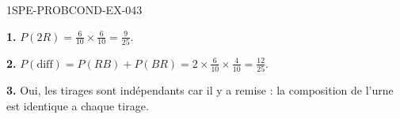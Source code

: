 \begin{corrige}{1SPE-PROBCOND-EX-043}

\textbf{1.} $P(2R) = \frac{6}{10}\times\frac{6}{10} = \frac{9}{25}$.

\textbf{2.} $P(\text{diff}) = P(RB)+P(BR) = 2\times\frac{6}{10}\times\frac{4}{10} = \frac{12}{25}$.

\textbf{3.} Oui, les tirages sont indépendants car il y a remise : la composition de l'urne est identique a chaque tirage.

\end{corrige}
